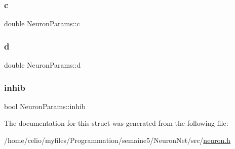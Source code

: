 \mbox{\label{structNeuronParams_a5df2ced2526eb84af2c8d2d34d9bfd93}} 
\subsubsection{\texorpdfstring{c}{c}}
{\footnotesize\ttfamily double Neuron\+Params\+::c}

\mbox{\label{structNeuronParams_af2bd3bad3bc5532186cdc8d056a10cfb}} 
\subsubsection{\texorpdfstring{d}{d}}
{\footnotesize\ttfamily double Neuron\+Params\+::d}

\mbox{\label{structNeuronParams_a751856d77a821cbd361b774d8653bbe6}} 
\subsubsection{\texorpdfstring{inhib}{inhib}}
{\footnotesize\ttfamily bool Neuron\+Params\+::inhib}



The documentation for this struct was generated from the following file\+:\begin{DoxyCompactItemize}
\item 
/home/celio/myfiles/\+Programmation/semaine5/\+Neuron\+Net/src/\hyperlink{neuron_8h}{neuron.\+h}\end{DoxyCompactItemize}

